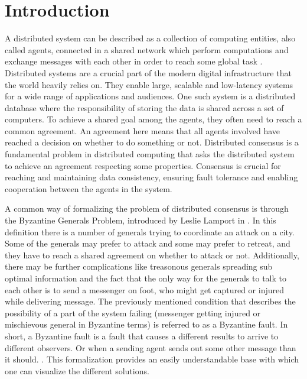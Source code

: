 \section{Introduction}
\thispagestyle{empty}

A distributed system can be described as a collection of computing entities, also called agents, connected in a shared network which perform computations and exchange messages with each other in order to reach some global task \cite{Coulouris_systems_2005}. Distributed systems are a crucial part of the modern digital infrastructure that the world heavily relies on. They enable large, scalable and low-latency systems for a wide range of applications and audiences. One such system is a distributed database where the responsibility of storing the data is shared across a set of computers. To achieve a shared goal among the agents, they often need to reach a common agreement. An agreement here means that all agents involved have reached a decision on whether to do something or not. Distributed consensus is a fundamental problem in distributed computing that asks the distributed system to achieve an agreement respecting some properties. Consensus is crucial for reaching and maintaining data consistency, ensuring fault tolerance and enabling cooperation between the agents in the system. \cite{Lynch_distributed_2017}

A common way of formalizing the problem of distributed consensus is through the Byzantine Generals Problem, introduced by Leslie Lamport in \cite{lamportByzantineGeneralsProblem}. In this definition there is a number of generals trying to coordinate an attack on a city. Some of the generals may prefer to attack and some may prefer to retreat, and they have to reach a shared agreement on whether to attack or not. Additionally, there may be further complications like treasonous generals spreading sub optimal information and the fact that the only way for the generals to talk to each other is to send a messenger on foot, who might get captured or injured while delivering message. 
The previously mentioned condition that describes the possibility of a part of the system failing (messenger getting injured or mischievous general in Byzantine terms) is referred to as a Byzantine fault. In short, a Byzantine fault is a fault that causes a different results to arrive to different observers. Or when a sending agent sends out some other message than it should. \cite{driscollRealByzantineGenerals2004}. 
This formalization provides an easily understandable base with which one can visualize the different solutions.

